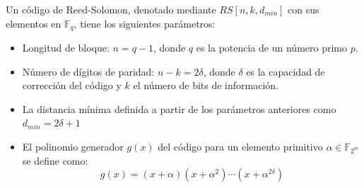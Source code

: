 Un código de Reed-Solomon, denotado mediante \(RS[n,k,d_{min}]\) con sus elementos en \(\mathbb{F}_q\), tiene los siguientes parámetros:
\begin{itemize}
	\item Longitud de bloque: \(n=q-1\), donde \(q\) es la potencia de un número primo \(p\).
	\item Número de dígitos de paridad: \(n-k=2\delta\), donde \(\delta\) es la capacidad de corrección del código y \(k\) el número de bits de información.
	\item La distancia mínima definida a partir de los parámetros anteriores como \(d_{min}=2\delta+1\)
	\item El polinomio generador \(g(x)\) del código para un elemento primitivo $\alpha\in \mathbb{F}_{2^m}$ se define como:
	\begin{equation}
		g(x)=\left(x+\alpha\right)\left(x+\alpha^{2}\right)\cdots \left(x+\alpha^{2\delta}\right)
	\end{equation}
\end{itemize}

